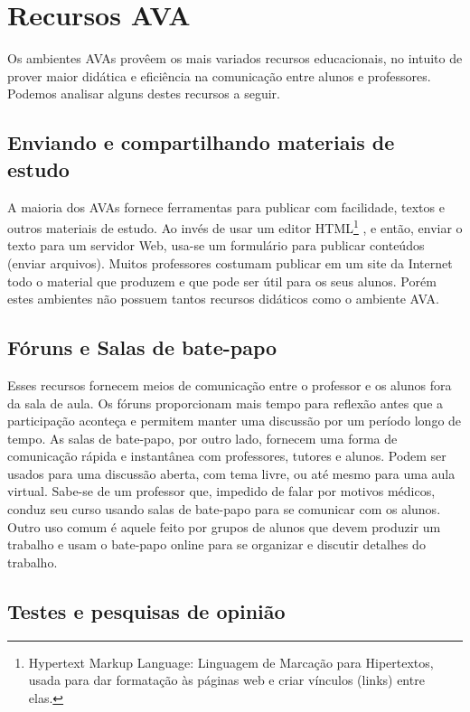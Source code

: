 
\section{Recursos AVA}
Os ambientes AVAs provêem os mais variados recursos educacionais, no intuito de prover maior didática e eficiência na comunicação entre alunos e professores.  Podemos analisar alguns destes recursos a seguir.

\subsection{Enviando e compartilhando materiais de estudo}
A maioria dos AVAs fornece ferramentas para publicar com facilidade, textos e outros materiais de estudo. Ao invés de usar um editor HTML\footnote{Hypertext Markup Language: Linguagem de Marcação para Hipertextos, usada para dar formatação às páginas web e criar vínculos (links) entre elas.} , e então, enviar o texto para um servidor Web, usa-se um formulário para publicar conteúdos (enviar arquivos). Muitos professores costumam publicar em um site da Internet todo o material que produzem e que pode ser útil para os seus alunos. Porém estes ambientes não possuem tantos recursos didáticos como o ambiente AVA.


\subsection{Fóruns e Salas de bate-papo}


Esses recursos fornecem meios de comunicação entre o professor e os alunos fora da sala de aula. Os fóruns proporcionam mais tempo para reflexão antes que a participação aconteça e permitem manter uma discussão por um período longo de tempo. As salas de bate-papo, por outro lado, fornecem uma forma de comunicação rápida e instantânea com professores, tutores e alunos. Podem ser usados para uma discussão aberta, com tema livre, ou até mesmo para uma aula virtual. Sabe-se de um professor que, impedido de falar por motivos médicos, conduz seu curso usando salas de bate-papo para se comunicar com os alunos. Outro uso comum é aquele feito por grupos de alunos que devem produzir um trabalho e usam o bate-papo online para se organizar e discutir detalhes do trabalho.

\subsection{Testes e pesquisas de opinião}

